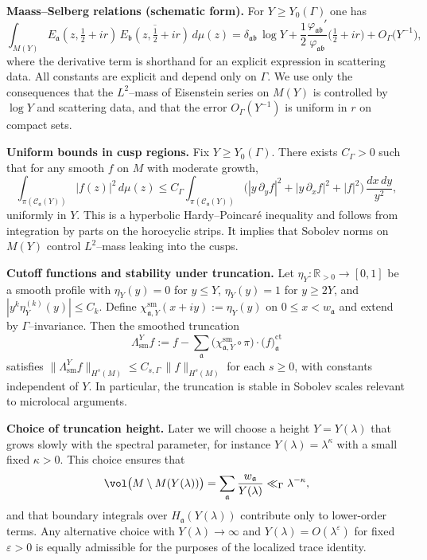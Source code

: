 \medskip
\noindent\textbf{Maass–Selberg relations (schematic form).}
For $Y\ge Y_0(\Gamma)$ one has
\[
  \int_{M(Y)} E_{\mathfrak{a}}(z,\tfrac12+ir)\,\overline{E_{\mathfrak{b}}(z,\tfrac12+ir)}\,d\mu(z)
  =
  \delta_{\mathfrak{a}\mathfrak{b}}\,\log Y
  + \frac{1}{2}\frac{\varphi_{\mathfrak{a}\mathfrak{b}}'}{\varphi_{\mathfrak{a}\mathfrak{b}}}\Big(\tfrac12+ir\Big)
  + O_{\Gamma}\!\big( Y^{-1} \big),
\]
where the derivative term is shorthand for an explicit expression in scattering data.
All constants are explicit and depend only on $\Gamma$.
We use only the consequences that the $L^{2}$–mass of Eisenstein series on $M(Y)$ is controlled by $\log Y$ and scattering data,
and that the error $O_{\Gamma}(Y^{-1})$ is uniform in $r$ on compact sets.

\medskip
\noindent\textbf{Uniform bounds in cusp regions.}
Fix $Y\ge Y_0(\Gamma)$.
There exists $C_\Gamma>0$ such that for any smooth $f$ on $M$ with moderate growth,
\[
  \int_{\pi(\mathcal{C}_{\mathfrak{a}}(Y))} |f(z)|^{2}\,d\mu(z)
  \le
  C_\Gamma
  \int_{\pi(\mathcal{C}_{\mathfrak{a}}(Y))} \big( |y\,\partial_y f|^{2} + |y\,\partial_x f|^{2} + |f|^{2} \big)\, \frac{dx\,dy}{y^{2}},
\]
uniformly in $Y$.
This is a hyperbolic Hardy–Poincaré inequality and follows from integration by parts on the horocyclic strips.
It implies that Sobolev norms on $M(Y)$ control $L^{2}$–mass leaking into the cusps.

\medskip
\noindent\textbf{Cutoff functions and stability under truncation.}
Let $\eta_Y:\mathbb{R}_{>0}\to[0,1]$ be a smooth profile with
$\eta_Y(y)=0$ for $y\le Y$, $\eta_Y(y)=1$ for $y\ge 2Y$, and $|y^{k}\eta_Y^{(k)}(y)|\le C_k$.
Define $\chi_{\mathfrak{a},Y}^{\mathrm{sm}}(x+iy) := \eta_Y(y)$ on $0\le x<w_{\mathfrak{a}}$ and extend by $\Gamma$–invariance.
Then the smoothed truncation
\[
  \Lambda_{\mathrm{sm}}^{Y} f
  :=
  f - \sum_{\mathfrak{a}}
  \big(\chi_{\mathfrak{a},Y}^{\mathrm{sm}}\circ\pi\big)\cdot \big(f\big)_{\mathfrak{a}}^{\mathrm{ct}}
\]
satisfies $\|\Lambda_{\mathrm{sm}}^{Y} f\|_{H^{s}(M)} \le C_{s,\Gamma}\,\|f\|_{H^{s}(M)}$ for each $s\ge 0$,
with constants independent of $Y$.
In particular, the truncation is stable in Sobolev scales relevant to microlocal arguments.

\medskip
\noindent\textbf{Choice of truncation height.}
Later we will choose a height $Y=Y(\lambda)$ that grows slowly with the spectral parameter,
for instance $Y(\lambda)=\lambda^{\kappa}$ with a small fixed $\kappa>0$.
This choice ensures that
\[
  \vol\big(M\setminus M(Y(\lambda))\big)
  =
  \sum_{\mathfrak{a}}\frac{w_{\mathfrak{a}}}{Y(\lambda)}
  \ll_{\Gamma} \lambda^{-\kappa},
\]
and that boundary integrals over $H_{\mathfrak{a}}(Y(\lambda))$ contribute only to lower-order terms.
Any alternative choice with $Y(\lambda)\to\infty$ and $Y(\lambda)=O(\lambda^{\varepsilon})$ for fixed $\varepsilon>0$
is equally admissible for the purposes of the localized trace identity.

